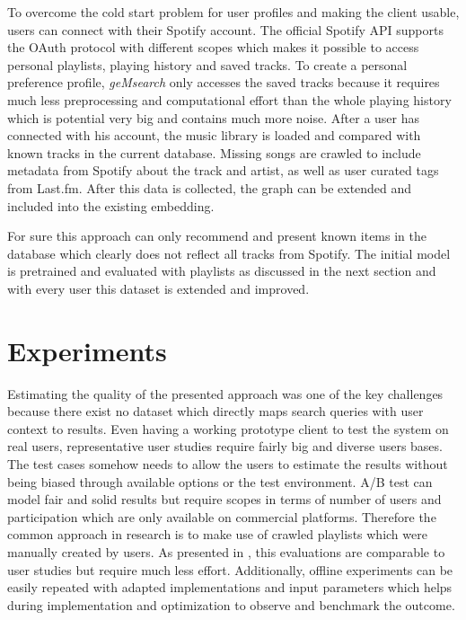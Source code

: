 \documentclass[sigconf]{acmart}
\begin{document}
\label{sec:impl_spotify_connect}
To overcome the cold start problem for user profiles and making the client usable, users can connect with their Spotify account. The official Spotify API supports the OAuth protocol with different scopes which makes it possible to access personal playlists, playing history and saved tracks. To create a personal preference profile, \emph{geMsearch} only accesses the saved tracks because it requires much less preprocessing and computational effort than the whole playing history which is potential very big and contains much more noise. After a user has connected with his account, the music library is loaded and compared with known tracks in the current database. Missing songs are crawled to include metadata from Spotify about the track and artist, as well as user curated tags from Last.fm. After this data is collected, the graph can be extended and included into the existing embedding.

For sure this approach can only recommend and present known items in the database which clearly does not reflect all tracks from Spotify. The initial model is pretrained and evaluated with playlists as discussed in the next section and with every user this dataset is extended and improved.

\section{Experiments}
Estimating the quality of the presented approach was one of the key challenges because there exist no dataset which directly maps search queries with user context to results. Even having a working prototype client to test the system on real users, representative user studies require fairly big and diverse users bases. The test cases somehow needs to allow the users to estimate the results without being biased through available options or the test environment. A/B test can model fair and solid results but require scopes in terms of number of users and participation which are only available on commercial platforms. Therefore the common approach in research is to make use of crawled playlists which were manually created by users. As presented in \cite{kamehkhosh2017user}, this evaluations are comparable to user studies but require much less effort. Additionally, offline experiments can be easily repeated with adapted implementations and input parameters which helps during implementation and optimization to observe and benchmark the outcome. \\
\end{document}
